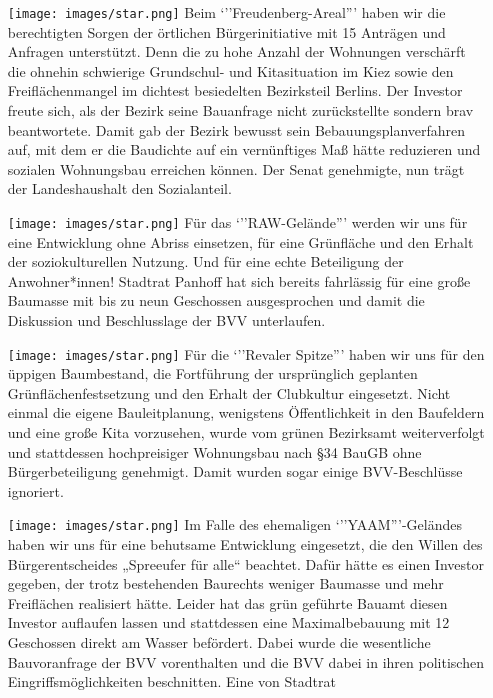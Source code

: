 \documentclass[a4paper,10pt]{article}
\begin{document}
\begin{itemize}
\itemsep1pt\parskip0pt
\item[\texttt{[image: images/star.png]}]
  Beim `''Freudenberg-Areal''' haben wir die berechtigten Sorgen der
  örtlichen Bürgerinitiative mit 15 Anträgen und Anfragen unterstützt.
  Denn die zu hohe Anzahl der Wohnungen verschärft die ohnehin
  schwierige Grundschul- und Kitasituation im Kiez sowie den
  Freiflächenmangel im dichtest besiedelten Bezirksteil Berlins. Der
  Investor freute sich, als der Bezirk seine Bauanfrage nicht
  zurückstellte sondern brav beantwortete. Damit gab der Bezirk bewusst
  sein Bebauungsplanverfahren auf, mit dem er die Baudichte auf ein
  vernünftiges Maß hätte reduzieren und sozialen Wohnungsbau erreichen
  können. Der Senat genehmigte, nun trägt der Landeshaushalt den
  Sozialanteil.
\item[\texttt{[image: images/star.png]}]
  Für das `''RAW-Gelände''' werden wir uns für eine Entwicklung ohne
  Abriss einsetzen, für eine Grünfläche und den Erhalt der
  soziokulturellen Nutzung. Und für eine echte Beteiligung der
  Anwohner*innen! Stadtrat Panhoff hat sich bereits fahrlässig für eine
  große Baumasse mit bis zu neun Geschossen ausgesprochen und damit die
  Diskussion und Beschlusslage der BVV unterlaufen.
\item[\texttt{[image: images/star.png]}]
  Für die `''Revaler Spitze''' haben wir uns für den üppigen
  Baumbestand, die Fortführung der ursprünglich geplanten
  Grünflächenfestsetzung und den Erhalt der Clubkultur eingesetzt. Nicht
  einmal die eigene Bauleitplanung, wenigstens Öffentlichkeit in den
  Baufeldern und eine große Kita vorzusehen, wurde vom grünen Bezirksamt
  weiterverfolgt und stattdessen hochpreisiger Wohnungsbau nach §34
  BauGB ohne Bürgerbeteiligung genehmigt. Damit wurden sogar einige
  BVV-Beschlüsse ignoriert.
\item[\texttt{[image: images/star.png]}]
  Im Falle des ehemaligen `''YAAM'''-Geländes haben wir uns für eine
  behutsame Entwicklung eingesetzt, die den Willen des Bürgerentscheides
  „Spreeufer für alle`` beachtet. Dafür hätte es einen Investor gegeben,
  der trotz bestehenden Baurechts weniger Baumasse und mehr Freiflächen
  realisiert hätte. Leider hat das grün geführte Bauamt diesen Investor
  auflaufen lassen und stattdessen eine Maximalbebauung mit 12
  Geschossen direkt am Wasser befördert. Dabei wurde die wesentliche
  Bauvoranfrage der BVV vorenthalten und die BVV dabei in ihren
  politischen Eingriffsmöglichkeiten beschnitten. Eine von Stadtrat

\end{itemize}
\end{document}

